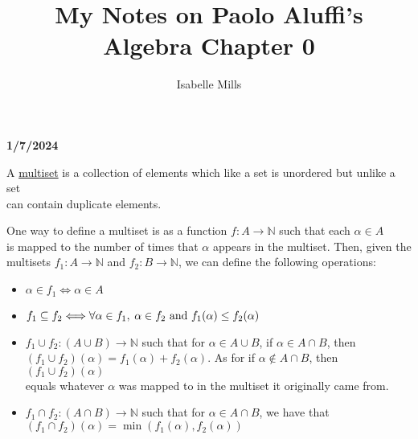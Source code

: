\documentclass{book}
\title{My Notes on Paolo Aluffi's Algebra Chapter 0}
\author{Isabelle Mills}
\newcommand{\hOne}{%
   \color{Black}%
   \fontsize{14}{16}\selectfont%
}
\newcommand{\hTwo}{%
   \color{MidnightBlue}%
   \fontsize{13}{15}\selectfont%
}
\newcommand{\hThree}{%
   \color{PineGreen!85!Orange}
   \fontsize{13}{15}\selectfont%
}
\newenvironment{myIndent}{%
   \begin{adjustwidth}{2.5em}{0em}%
}{%
   \end{adjustwidth}%
}
\newcommand{\udefine}[1]{{%
   \setulcolor{Red}%
   \setul{0.14em}{0.07em}%
   \ul{#1}%
}}
\newcommand*{\markDate}[1]{%
   {\huge \color{Black} \textbf{#1} \newline}%
}
\begin{document}
   \maketitle{}
   \calibri

   \markDate{1/7/2024}

   \hOne
   A \udefine{multiset} is a collection of elements 
   which like a set is unordered but unlike a set\\ can
   contain duplicate elements.
   
   \begin{myIndent}
      \hTwo
      One way to define a multiset is as a function
      \( f: A\rightarrow\mathbb{N} \) such that each
      \(\alpha \in A \)\\ is mapped to the number of times that 
      \(\alpha\) appears in the multiset. Then, given the\\ multisets 
      \(f_{1}: A\rightarrow \mathbb{N}\) and \(f_{2}: 
      B \rightarrow \mathbb{N}\), we can define the following
      operations:
      \hThree
      \begin{itemize}
         \item \(\alpha \in f_{1} \Longleftrightarrow \alpha \in A\)\\ [-10pt]

         \item \(f_{1} \subseteq f_{2} \Longleftrightarrow 
               \forall \alpha \in f_{1}, \hspace{0.25em} \alpha \in f_{2} 
               \text{ and } f_{1}(\alpha) \leq f_{2}(\alpha)\)\\ [-12pt]

         \item \(f_{1} \cup f_{2}: (A \cup B) \longrightarrow
               \mathbb{N} \) such that for \(\alpha
               \in A \cup B\), if \(\alpha \in A \cap B \),
               then\\ \((f_{1} \cup f_{2})(\alpha) = f_{1}(\alpha)
               + f_{2}(\alpha)\). As for if \(\alpha \notin 
               A \cap B \), then \((f_{1} \cup f_{2})(\alpha)\)\\
               equals whatever $\alpha$ was mapped to 
               in the multiset it originally came from.\\ [-12pt]
         
         \item \(f_{1} \cap f_{2}: (A \cap B) \longrightarrow
               \mathbb{N} \) such that for \(\alpha
               \in A \cap B\), we have that\\
               \((f_{1} \cap f_{2})(\alpha) = \min(f_{1}(\alpha)
               , f_{2}(\alpha))\)\\ [-12pt]
         

\end{itemize}
\end{myIndent}
\end{document}
